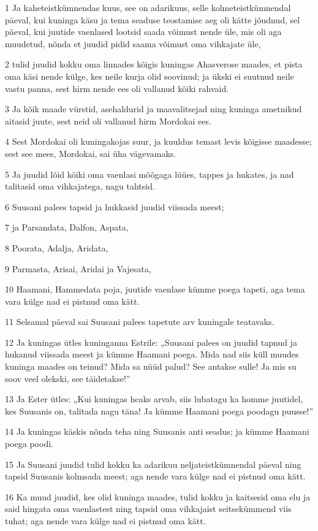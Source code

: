 \par 1 Ja kaheteistkümnendas kuus, see on adarikuus, selle kolmeteistkümnendal päeval, kui kuninga käsu ja tema seaduse teostamise aeg oli kätte jõudnud, sel päeval, kui juutide vaenlased lootsid saada võimust nende üle, mis oli aga muudetud, nõnda et juudid pidid saama võimust oma vihkajate üle,
\par 2 tulid juudid kokku oma linnades kõigis kuningas Ahasverose maades, et pista oma käsi nende külge, kes neile kurja olid soovinud; ja ükski ei suutnud neile vastu panna, sest hirm nende ees oli vallanud kõiki rahvaid.
\par 3 Ja kõik maade vürstid, asehaldurid ja maavalitsejad ning kuninga ametnikud aitasid juute, sest neid oli vallanud hirm Mordokai ees.
\par 4 Sest Mordokai oli kuningakojas suur, ja kuuldus temast levis kõigisse maadesse; sest see mees, Mordokai, sai üha vägevamaks.
\par 5 Ja juudid lõid kõiki oma vaenlasi mõõgaga lüües, tappes ja hukates, ja nad talitasid oma vihkajatega, nagu tahtsid.
\par 6 Suusani palees tapsid ja hukkasid juudid viissada meest;
\par 7 ja Parsandata, Dalfon, Aspata,
\par 8 Poorata, Adalja, Aridata,
\par 9 Parmasta, Arisai, Aridai ja Vajesata,
\par 10 Haamani, Hammedata poja, juutide vaenlase kümme poega tapeti, aga tema vara külge nad ei pistnud oma kätt.
\par 11 Selsamal päeval sai Suusani palees tapetute arv kuningale teatavaks.
\par 12 Ja kuningas ütles kuninganna Estrile: „Suusani palees on juudid tapnud ja hukanud viissada meest ja kümme Haamani poega. Mida nad siis küll muudes kuninga maades on teinud? Mida sa nüüd palud? See antakse sulle! Ja mis su soov veel olekski, see täidetakse!”
\par 13 Ja Ester ütles: „Kui kuningas heaks arvab, siis lubatagu ka homme juutidel, kes Suusanis on, talitada nagu täna! Ja kümme Haamani poega poodagu puusse!”
\par 14 Ja kuningas käskis nõnda teha ning Suusanis anti seadus; ja kümme Haamani poega poodi.
\par 15 Ja Suusani juudid tulid kokku ka adarikuu neljateistkümnendal päeval ning tapsid Suusanis kolmsada meest; aga nende vara külge nad ei pistnud oma kätt.
\par 16 Ka muud juudid, kes olid kuninga maades, tulid kokku ja kaitsesid oma elu ja said hingata oma vaenlastest ning tapsid oma vihkajaist seitsekümmend viis tuhat; aga nende vara külge nad ei pistnud oma kätt.
